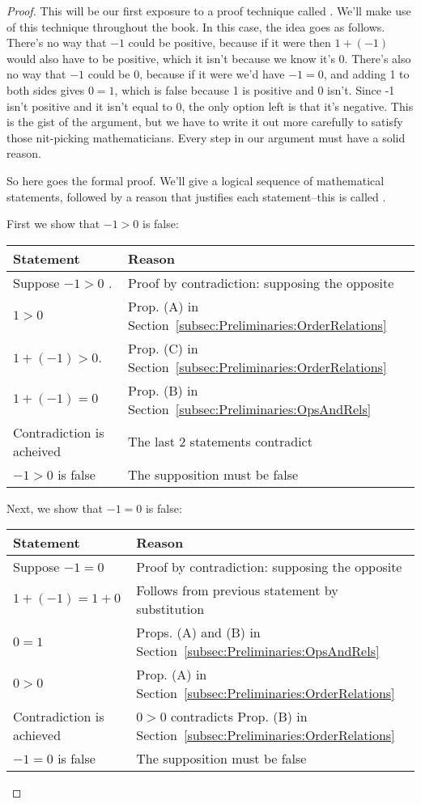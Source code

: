 \begin{proof}
This will be our first exposure to a proof technique called . We'll make use of this technique throughout the book. In this case, the idea goes as follows.  There's no way that $-1$ could be positive, because if it were then $1 + (-1)$ would also have to be positive, which it isn't because we know it's 0.  There's also no way that $-1$ could be 0, because if it were we'd have $-1=0$, and adding 1 to both sides gives $0 = 1$, which is false because 1 is positive and 0 isn't.  Since -1 isn't positive and it isn't equal to 0, the only option left is that it's negative. This is the gist of the argument, but we have to write it out more carefully to satisfy those nit-picking mathematicians. Every step in our argument must have a solid reason. 

So here goes the formal proof. We'll give a logical sequence of mathematical statements, followed by a reason that justifies each statement--this is called .

\noindent
First we show that $-1 > 0$ is false:

\begin{tabular}{l| l}
Statement& Reason\\
\hline
Suppose $-1>0$ . & Proof by contradiction: supposing the opposite\\
$1>0$ &  Prop. (A) in Section~\ref{subsec:Preliminaries:OrderRelations}\\
$1 + (-1)> 0$. & Prop. (C) in  Section~\ref{subsec:Preliminaries:OrderRelations}\\
$1 + (-1) = 0$ & Prop. (B) in Section~\ref{subsec:Preliminaries:OpsAndRels}\\
Contradiction is acheived&  The last 2 statements contradict\\
$-1>0 $ is false& The supposition must be false
\end{tabular}

\noindent
Next, we show that $-1=0$ is false:

\begin{tabular}{l| l}
Statement& Reason\\
\hline
Suppose $-1=0$ & Proof by contradiction: supposing the opposite\\
$1 + (-1) = 1 + 0$ & Follows from previous statement by substitution\\
$0=1$   & Props. (A) and (B) in Section~\ref{subsec:Preliminaries:OpsAndRels}\\
$0>0$  & Prop. (A)  in  Section~\ref{subsec:Preliminaries:OrderRelations}\\
Contradiction is achieved & $0>0$ contradicts Prop. (B)  in  Section~\ref{subsec:Preliminaries:OrderRelations}\\
$-1 = 0$ is false &The supposition must be false
\end{tabular}


\end{proof}
